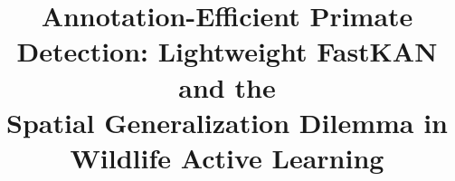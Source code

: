 \documentclass[conference]{IEEEtran}
\newif\ifanonymous
\begin{document}
\title{Annotation-Efficient Primate Detection: Lightweight FastKAN and the\\
       Spatial Generalization Dilemma in Wildlife Active Learning}

\ifanonymous
\author{
  \IEEEauthorblockN{Anonymous Authors}
  \IEEEauthorblockA{Paper ID: \textbf{CVPR-2026-XXXX}\\
  Double-Blind Review Copy}
}
\else
\author{
}
\fi

\maketitle
\end{document}
